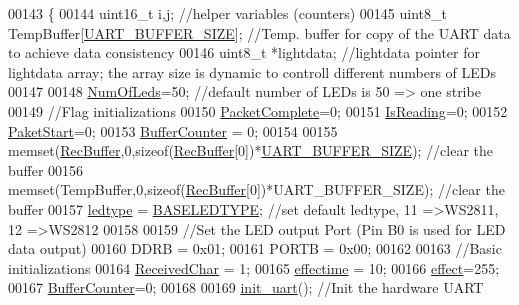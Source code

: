 \begin{DoxyCode}
{00143 \{
00144     uint16\_t i,j;                           \textcolor{comment}{//helper variables (counters)}
00145     uint8\_t TempBuffer[\hyperlink{globals_8h_a0d57378e32bf8278011460740bc29f7f}{UART\_BUFFER\_SIZE}];   \textcolor{comment}{//Temp. buffer for copy of the UART data to
       achieve data consistency    }
00146     uint8\_t *lightdata;                     \textcolor{comment}{//lightdata pointer for lightdata array; the array size is
       dynamic to controll different numbers of LEDs}
00147     
00148     \hyperlink{globals_8h_ad5db4045aed262ed4aae2af9d81fab98}{NumOfLeds}=50;                          \textcolor{comment}{//default number of LEDs is 50 => one stribe}
00149     \textcolor{comment}{//Flag initializations}
00150     \hyperlink{globals_8h_a1b09d1a5bcf4c8ab435bb3c9e36def59}{PacketComplete}=0;                         
00151     \hyperlink{globals_8h_a922ad5baed647eca43ad1a979e162ebd}{IsReading}=0;
00152     \hyperlink{globals_8h_aaa3bddd2273257ac5ec259197b62e984}{PaketStart}=0; 
00153     \hyperlink{globals_8h_aa6fcb4d4fca4554ac73bef10668c23cd}{BufferCounter} = 0;
00154 
00155     memset(\hyperlink{globals_8h_a5d735865707e6694a8173d629e0b4d5c}{RecBuffer},0,\textcolor{keyword}{sizeof}(\hyperlink{globals_8h_a5d735865707e6694a8173d629e0b4d5c}{RecBuffer}[0])*\hyperlink{globals_8h_a0d57378e32bf8278011460740bc29f7f}{UART\_BUFFER\_SIZE});    \textcolor{comment}{//clear
       the buffer  }
00156     memset(TempBuffer,0,\textcolor{keyword}{sizeof}(\hyperlink{globals_8h_a5d735865707e6694a8173d629e0b4d5c}{RecBuffer}[0])*UART\_BUFFER\_SIZE);    \textcolor{comment}{//clear the buffer}
00157     \hyperlink{globals_8h_a722e1eb38b661d1338ada3cc7a4049a0}{ledtype} = \hyperlink{globals_8h_af07a5ce170c7be13d096843960e7b9da}{BASELEDTYPE};                    \textcolor{comment}{//set default ledtype, 11 =>WS2811, 12
       =>WS2812}
00158     
00159     \textcolor{comment}{//Set the LED output Port (Pin B0 is used for LED data output)}
00160     DDRB = 0x01;                        
00161     PORTB = 0x00;
00162 
00163     \textcolor{comment}{//Basic initializations}
00164     \hyperlink{globals_8h_ab5490074aaca289e986e9a00e0c25663}{ReceivedChar} = 1;
00165     \hyperlink{globals_8h_ac2445d316b2972d381edeac44bb6a226}{effectime} = 10;
00166     \hyperlink{globals_8h_a053b8e1f039c19251b90d60317db8aed}{effect}=255;
00167     \hyperlink{globals_8h_aa6fcb4d4fca4554ac73bef10668c23cd}{BufferCounter}=0;
00168     
00169     \hyperlink{ws2811lichterkette_8c_ac7b3df0fa68526d64c732d5f916e34b1}{init\_uart}();                           \textcolor{comment}{//Init the hardware UART}
}
\end{DoxyCode}
